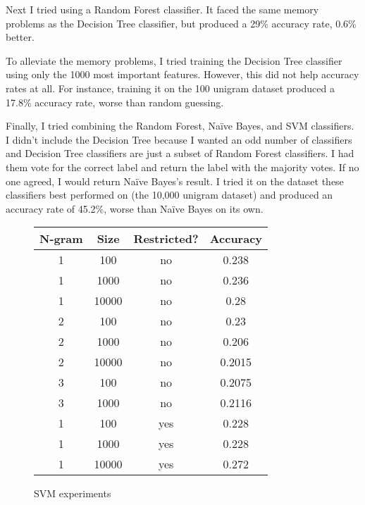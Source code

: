 \documentclass[11pt, onecolumn]{IEEEtran}
\begin{document}
Next I tried using a Random Forest classifier. It faced the same memory problems as the Decision Tree classifier, but produced a 29\% accuracy rate, 0.6\% better. 

To alleviate the memory problems, I tried training the Decision Tree classifier using only the 1000 most important features. However, this did not help accuracy rates at all. For instance, training it on the 100 unigram dataset produced a 17.8\% accuracy rate, worse than random guessing.

Finally, I tried combining the Random Forest, Na\"{i}ve Bayes, and SVM classifiers. I didn't include the Decision Tree because I wanted an odd number of classifiers and Decision Tree classifiers are just a subset of Random Forest classifiers. I had them vote for the correct label and return the label with the majority votes. If no one agreed, I would return Na\"{i}ve Bayes's result. I tried it on the dataset these classifiers best performed on (the 10,000 unigram dataset) and produced an accuracy rate of 45.2\%, worse than Na\"{i}ve Bayes on its own. 

\begin{figure}[H]
	\begin{center}
		\begin{tabular}{ | c | c | c | c | }
		\hline
		N-gram & Size & Restricted? & Accuracy\\
		\hline \hline
		1 & 100 & no & 0.238 \\
		\hline
		1 & 1000 & no & 0.236 \\
		\hline
		1 & 10000 & no & 0.28 \\
		\hline
		2 & 100 & no & 0.23 \\
		\hline
		2 & 1000 & no & 0.206 \\
		\hline
		2 & 10000 & no & 0.2015 \\
		\hline
		3 & 100 & no & 0.2075 \\
		\hline
		3 & 1000 & no & 0.2116 \\
		\hline
		1 & 100 & yes & 0.228 \\
		\hline
		1 & 1000 & yes & 0.228 \\
		\hline
		1 & 10000 & yes & 0.272 \\
		\hline
		\end{tabular}
	\end{center}
\caption{SVM experiments}
\label{svmresults}
\end{figure}
\end{document}
